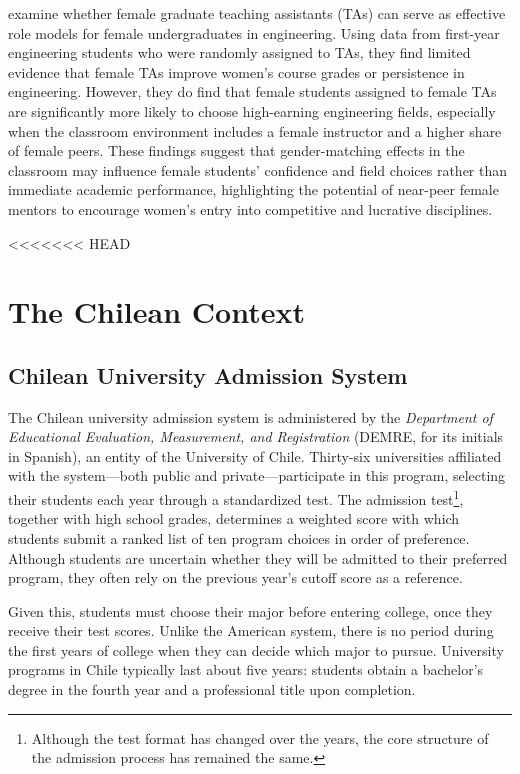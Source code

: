 \citet{griffith_role_2021} examine whether female graduate teaching assistants (TAs) can serve as effective role models for female undergraduates in engineering. Using data from first-year engineering students who were randomly assigned to TAs, they find limited evidence that female TAs improve women’s course grades or persistence in engineering. However, they do find that female students assigned to female TAs are significantly more likely to choose high-earning engineering fields, especially when the classroom environment includes a female instructor and a higher share of female peers. These findings suggest that gender-matching effects in the classroom may influence female students’ confidence and field choices rather than immediate academic performance, highlighting the potential of near-peer female mentors to encourage women’s entry into competitive and lucrative disciplines.
 
<<<<<<< HEAD
 \section{ The Chilean Context}
 
 \subsection{ Chilean University Admission System}
The Chilean university admission system is administered by the \textit{Department of Educational Evaluation, Measurement, and Registration} (DEMRE, for its initials in Spanish), an entity of the University of Chile. Thirty-six universities affiliated with the system—both public and private—participate in this program, selecting their students each year through a standardized test. The admission test\footnote{Although the test format has changed over the years, the core structure of the admission process has remained the same.}, together with high school grades, determines a weighted score with which students submit a ranked list of ten program choices in order of preference. Although students are uncertain whether they will be admitted to their preferred program, they often rely on the previous year's cutoff score as a reference.

Given this, students must choose their major before entering college, once they receive their test scores. Unlike the American system, there is no period during the first years of college when they can decide which major to pursue. University programs in Chile typically last about five years: students obtain a bachelor’s degree in the fourth year and a professional title upon completion.

